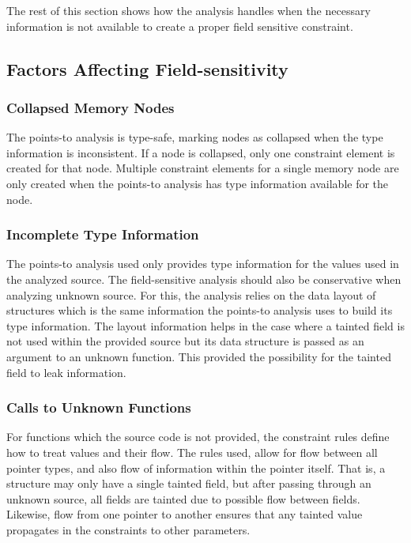  The rest of this section shows how the analysis handles when the necessary
 information is not available to create a proper field sensitive constraint.

\subsection{Factors Affecting Field-sensitivity}
\subsubsection{Collapsed Memory Nodes}

   The points-to analysis is type-safe, marking nodes as collapsed when the type
   information is inconsistent. If a node is collapsed, only one constraint
   element is created for that node. Multiple constraint elements for a single
   memory node are only created when the points-to analysis has type information
   available for the node.

\subsubsection{Incomplete Type Information}
 
   The points-to analysis used only provides type information for the values used
   in the analyzed source. The field-sensitive analysis should also be
   conservative when analyzing unknown source. For this, the analysis relies on
   the data layout of structures which is the same information the points-to
   analysis uses to build its type information. The layout information helps in
   the case where a tainted field is not used within the provided source but its
   data structure is passed as an argument to an unknown function. This provided
   the possibility for the tainted field to leak information.

\subsubsection{Calls to Unknown Functions}

For functions which the source code is not provided, the constraint rules define
how to treat values and their flow. The rules used, allow for flow between all
pointer types, and also flow of information within the pointer itself. That is,
a structure may only have a single tainted field, but after passing through an
unknown source, all fields are tainted due to possible flow between fields.
Likewise, flow from one pointer to another ensures that any tainted value
propagates in the constraints to other parameters.

